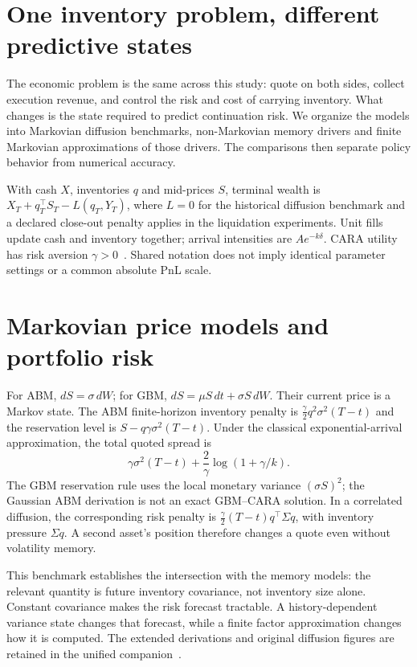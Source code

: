\section{One inventory problem, different predictive states}
The economic problem is the same across this study: quote on both sides, collect execution revenue, and control the risk and cost of carrying inventory. What changes is the state required to predict continuation risk. We organize the models into Markovian diffusion benchmarks, non-Markovian memory drivers and finite Markovian approximations of those drivers. The comparisons then separate policy behavior from numerical accuracy.

With cash $X$, inventories $q$ and mid-prices $S$, terminal wealth is $X_T+q_T^\top S_T-L(q_T,Y_T)$, where $L=0$ for the historical diffusion benchmark and a declared close-out penalty applies in the liquidation experiments. Unit fills update cash and inventory together; arrival intensities are $Ae^{-k\delta}$. CARA utility has risk aversion $\gamma>0$~\cite{AvellanedaStoikov2008}. Shared notation does not imply identical parameter settings or a common absolute PnL scale.

\section{Markovian price models and portfolio risk}
For ABM, $dS=\sigma\,dW$; for GBM, $dS=\mu S\,dt+\sigma S\,dW$. Their current price is a Markov state. The ABM finite-horizon inventory penalty is $\frac\gamma2q^2\sigma^2(T-t)$ and the reservation level is $S-q\gamma\sigma^2(T-t)$. Under the classical exponential-arrival approximation, the total quoted spread is
\[
\gamma\sigma^2(T-t)+\frac{2}{\gamma}\log(1+\gamma/k).
\]
The GBM reservation rule uses the local monetary variance $(\sigma S)^2$; the Gaussian ABM derivation is not an exact GBM--CARA solution. In a correlated diffusion, the corresponding risk penalty is $\frac\gamma2(T-t)q^\top\Sigma q$, with inventory pressure $\Sigma q$. A second asset's position therefore changes a quote even without volatility memory.

This benchmark establishes the intersection with the memory models: the relevant quantity is future inventory covariance, not inventory size alone. Constant covariance makes the risk forecast tractable. A history-dependent variance state changes that forecast, while a finite factor approximation changes how it is computed. The extended derivations and original diffusion figures are retained in the unified companion~\cite{hft1}.

